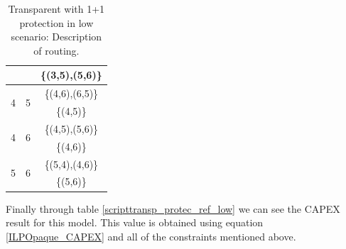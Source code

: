 \begin{table}[h!]
\begin{tabular}{|| c | c | c ||}
 & & \{(3,5),(5,6)\} \\ \hline
 \multirow{2}{*}{4} & \multirow{2}{*}{5} & \{(4,6),(6,5)\} \\
 & & \{(4,5)\} \\ \hline
 \multirow{2}{*}{4} & \multirow{2}{*}{6} & \{(4,5),(5,6)\} \\
 & & \{(4,6)\} \\ \hline
 \multirow{2}{*}{5} & \multirow{2}{*}{6} & \{(5,4),(4,6)\} \\
 & & \{(5,6)\} \\
 \hline
\end{tabular}
\caption{Transparent with 1+1 protection in low scenario: Description of routing.}
\label{path_transp_protec_ref_low}
\end{table}

Finally through table \ref{scripttransp_protec_ref_low} we can see the CAPEX result for this model. This value is obtained using equation \ref{ILPOpaque_CAPEX} and all of the constraints mentioned above.\\
\newpage
